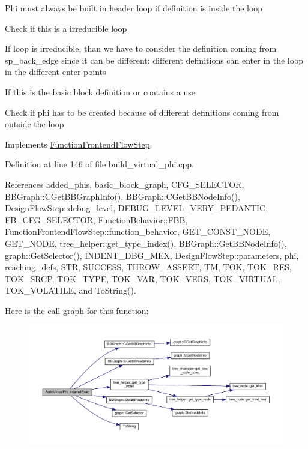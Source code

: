 Phi must always be built in header loop if definition is inside the loop

Check if this is a irreducible loop

If loop is irreducible, than we have to consider the definition coming from sp\+\_\+back\+\_\+edge since it can be different\+: different definitions can enter in the loop in the different enter points

If this is the basic block definition or contains a use

Check if phi has to be created because of different definitions coming from outside the loop 

Implements \hyperlink{classFunctionFrontendFlowStep_a00612f7fb9eabbbc8ee7e39d34e5ac68}{Function\+Frontend\+Flow\+Step}.



Definition at line 146 of file build\+\_\+virtual\+\_\+phi.\+cpp.



References added\+\_\+phis, basic\+\_\+block\+\_\+graph, C\+F\+G\+\_\+\+S\+E\+L\+E\+C\+T\+OR, B\+B\+Graph\+::\+C\+Get\+B\+B\+Graph\+Info(), B\+B\+Graph\+::\+C\+Get\+B\+B\+Node\+Info(), Design\+Flow\+Step\+::debug\+\_\+level, D\+E\+B\+U\+G\+\_\+\+L\+E\+V\+E\+L\+\_\+\+V\+E\+R\+Y\+\_\+\+P\+E\+D\+A\+N\+T\+IC, F\+B\+\_\+\+C\+F\+G\+\_\+\+S\+E\+L\+E\+C\+T\+OR, Function\+Behavior\+::\+F\+BB, Function\+Frontend\+Flow\+Step\+::function\+\_\+behavior, G\+E\+T\+\_\+\+C\+O\+N\+S\+T\+\_\+\+N\+O\+DE, G\+E\+T\+\_\+\+N\+O\+DE, tree\+\_\+helper\+::get\+\_\+type\+\_\+index(), B\+B\+Graph\+::\+Get\+B\+B\+Node\+Info(), graph\+::\+Get\+Selector(), I\+N\+D\+E\+N\+T\+\_\+\+D\+B\+G\+\_\+\+M\+EX, Design\+Flow\+Step\+::parameters, phi, reaching\+\_\+defs, S\+TR, S\+U\+C\+C\+E\+SS, T\+H\+R\+O\+W\+\_\+\+A\+S\+S\+E\+RT, TM, T\+OK, T\+O\+K\+\_\+\+R\+ES, T\+O\+K\+\_\+\+S\+R\+CP, T\+O\+K\+\_\+\+T\+Y\+PE, T\+O\+K\+\_\+\+V\+AR, T\+O\+K\+\_\+\+V\+E\+RS, T\+O\+K\+\_\+\+V\+I\+R\+T\+U\+AL, T\+O\+K\+\_\+\+V\+O\+L\+A\+T\+I\+LE, and To\+String().

Here is the call graph for this function\+:
\nopagebreak
\begin{figure}[H]
\begin{center}
\leavevmode
\includegraphics[width=350pt]{d8/d9b/classBuildVirtualPhi_a62df9f8fb288d11ede0f7fa4e61b4f1b_cgraph}
\end{center}
\end{figure}


